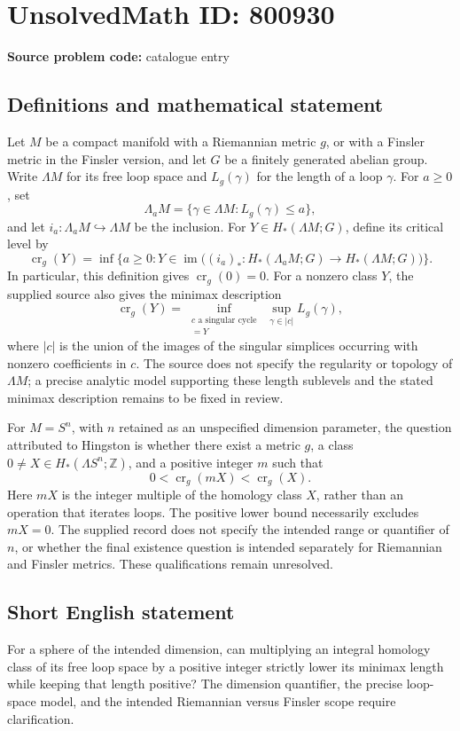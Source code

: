 \documentclass[11pt]{article}
\newcommand{\Z}{\mathbb{Z}}
\begin{document}
\section*{UnsolvedMath ID: 800930}
\textbf{Source problem code:} catalogue entry
\subsection{Definitions and mathematical statement}
Let \(M\) be a compact manifold with a Riemannian metric \(g\), or with a Finsler metric in the Finsler version, and let \(G\) be a finitely generated abelian group. Write \(\Lambda M\) for its free loop space and \(L_g(\gamma)\) for the length of a loop \(\gamma\). For \(a\geq 0\), set
\[
\Lambda_a M=\{\gamma\in\Lambda M:L_g(\gamma)\leq a\},
\]
and let \(i_a:\Lambda_a M\hookrightarrow\Lambda M\) be the inclusion. For \(Y\in H_*(\Lambda M;G)\), define its critical level by
\[
\operatorname{cr}_g(Y)=\inf\bigl\{a\geq 0:Y\in\operatorname{im}\bigl((i_a)_*:H_*(\Lambda_a M;G)\longrightarrow H_*(\Lambda M;G)\bigr)\bigr\}.
\]
In particular, this definition gives \(\operatorname{cr}_g(0)=0\). For a nonzero class \(Y\), the supplied source also gives the minimax description
\[
\operatorname{cr}_g(Y)=\inf_{\substack{c\text{ a singular cycle}\\ [c]=Y}}\ \sup_{\gamma\in |c|}L_g(\gamma),
\]
where \(|c|\) is the union of the images of the singular simplices occurring with nonzero coefficients in \(c\). The source does not specify the regularity or topology of \(\Lambda M\); a precise analytic model supporting these length sublevels and the stated minimax description remains to be fixed in review.

For \(M=S^n\), with \(n\) retained as an unspecified dimension parameter, the question attributed to Hingston is whether there exist a metric \(g\), a class \(0\neq X\in H_*(\Lambda S^n;\Z)\), and a positive integer \(m\) such that
\[
0<\operatorname{cr}_g(mX)<\operatorname{cr}_g(X).
\]
Here \(mX\) is the integer multiple of the homology class \(X\), rather than an operation that iterates loops. The positive lower bound necessarily excludes \(mX=0\). The supplied record does not specify the intended range or quantifier of \(n\), or whether the final existence question is intended separately for Riemannian and Finsler metrics. These qualifications remain unresolved.
\subsection{Short English statement}
For a sphere of the intended dimension, can multiplying an integral homology class of its free loop space by a positive integer strictly lower its minimax length while keeping that length positive? The dimension quantifier, the precise loop-space model, and the intended Riemannian versus Finsler scope require clarification.
\end{document}
